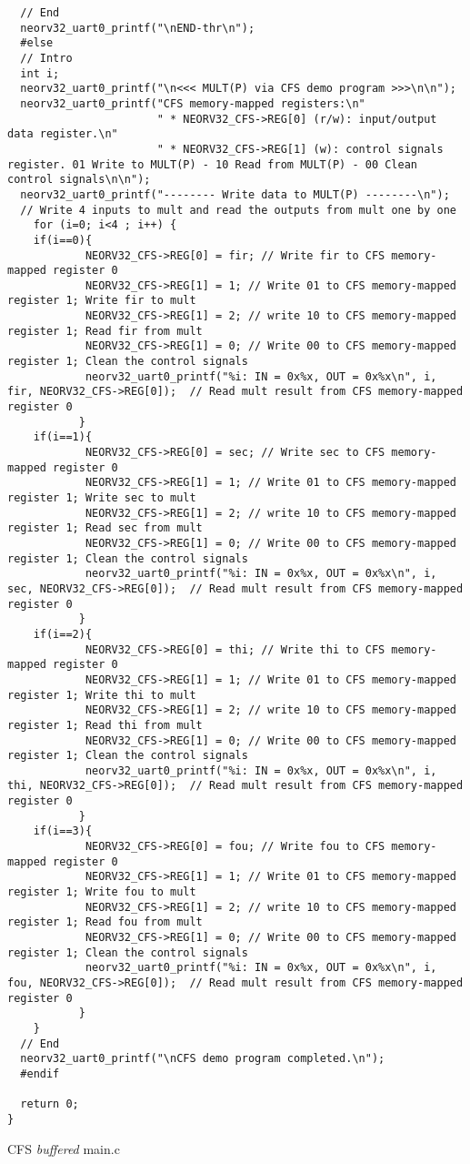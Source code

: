 \begin{code}
\begin{verbatim}
  // End
  neorv32_uart0_printf("\nEND-thr\n");
  #else
  // Intro
  int i;
  neorv32_uart0_printf("\n<<< MULT(P) via CFS demo program >>>\n\n");
  neorv32_uart0_printf("CFS memory-mapped registers:\n"
                       " * NEORV32_CFS->REG[0] (r/w): input/output data register.\n"
                       " * NEORV32_CFS->REG[1] (w): control signals register. 01 Write to MULT(P) - 10 Read from MULT(P) - 00 Clean control signals\n\n");
  neorv32_uart0_printf("-------- Write data to MULT(P) --------\n");
  // Write 4 inputs to mult and read the outputs from mult one by one
    for (i=0; i<4 ; i++) {
    if(i==0){
            NEORV32_CFS->REG[0] = fir; // Write fir to CFS memory-mapped register 0
            NEORV32_CFS->REG[1] = 1; // Write 01 to CFS memory-mapped register 1; Write fir to mult
            NEORV32_CFS->REG[1] = 2; // write 10 to CFS memory-mapped register 1; Read fir from mult
            NEORV32_CFS->REG[1] = 0; // Write 00 to CFS memory-mapped register 1; Clean the control signals
            neorv32_uart0_printf("%i: IN = 0x%x, OUT = 0x%x\n", i, fir, NEORV32_CFS->REG[0]);  // Read mult result from CFS memory-mapped register 0  
           } 
    if(i==1){
            NEORV32_CFS->REG[0] = sec; // Write sec to CFS memory-mapped register 0
            NEORV32_CFS->REG[1] = 1; // Write 01 to CFS memory-mapped register 1; Write sec to mult
            NEORV32_CFS->REG[1] = 2; // write 10 to CFS memory-mapped register 1; Read sec from mult
            NEORV32_CFS->REG[1] = 0; // Write 00 to CFS memory-mapped register 1; Clean the control signals
            neorv32_uart0_printf("%i: IN = 0x%x, OUT = 0x%x\n", i, sec, NEORV32_CFS->REG[0]);  // Read mult result from CFS memory-mapped register 0  
           }   
    if(i==2){
            NEORV32_CFS->REG[0] = thi; // Write thi to CFS memory-mapped register 0
            NEORV32_CFS->REG[1] = 1; // Write 01 to CFS memory-mapped register 1; Write thi to mult
            NEORV32_CFS->REG[1] = 2; // write 10 to CFS memory-mapped register 1; Read thi from mult
            NEORV32_CFS->REG[1] = 0; // Write 00 to CFS memory-mapped register 1; Clean the control signals
            neorv32_uart0_printf("%i: IN = 0x%x, OUT = 0x%x\n", i, thi, NEORV32_CFS->REG[0]);  // Read mult result from CFS memory-mapped register 0  
           }   
    if(i==3){
            NEORV32_CFS->REG[0] = fou; // Write fou to CFS memory-mapped register 0
            NEORV32_CFS->REG[1] = 1; // Write 01 to CFS memory-mapped register 1; Write fou to mult
            NEORV32_CFS->REG[1] = 2; // write 10 to CFS memory-mapped register 1; Read fou from mult
            NEORV32_CFS->REG[1] = 0; // Write 00 to CFS memory-mapped register 1; Clean the control signals
            neorv32_uart0_printf("%i: IN = 0x%x, OUT = 0x%x\n", i, fou, NEORV32_CFS->REG[0]);  // Read mult result from CFS memory-mapped register 0  
           }   
    } 
  // End
  neorv32_uart0_printf("\nCFS demo program completed.\n");
  #endif

  return 0;
}
\end{verbatim}
\caption{CFS \textit{buffered} main.c}
\label{ap-cod:14}
\end{code}

